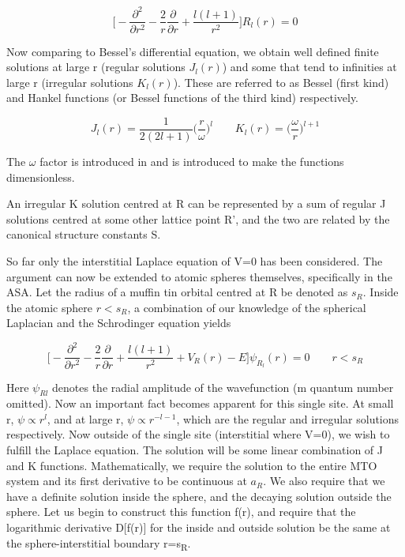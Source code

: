 \documentclass[12pt]{article}
\begin{document}
\begin{equation} \label{3.3} \tag{3.3}
\bigg[-\frac{\partial^2}{\partial r^2}-\frac{2}{r}\frac{\partial}{\partial r}+\frac{l(l+1)}{r^2} \bigg]R_l(r)=0
\end{equation}

Now comparing to Bessel's differential equation, we obtain well defined finite solutions at large r (regular solutions $J_l(r)$) and some that tend to infinities at large r (irregular solutions $K_l(r)$). These are referred to as Bessel (first kind) and Hankel functions (or Bessel functions of the third kind) respectively. 

\begin{equation} \label{3.4} \tag{3.4}
J_l(r)=\frac{1}{2(2l+1)}\bigg(\frac{r}{\omega}\bigg)^l \qquad K_l(r)=\bigg(\frac{\omega}{r}\bigg)^{l+1}
\end{equation}


The $\omega$ factor is introduced in \cite{andersen} and is introduced to make the functions dimensionless.

An irregular K solution centred at R can be represented by a sum of regular J solutions centred at some other lattice point R', and the two are related by the canonical structure constants S. %

So far only the interstitial Laplace equation of V=0 has been considered. The argument can now be extended to atomic spheres themselves, specifically in the ASA. Let the radius of a muffin tin orbital centred at R be denoted as $s_R$. Inside the atomic sphere $r<s_R$, a combination of our knowledge of the spherical Laplacian and the Schrodinger equation yields

\begin{equation} \label{3.5} \tag{3.5}
\bigg[-\frac{\partial^2}{\partial r^2}-\frac{2}{r}\frac{\partial}{\partial r}+\frac{l(l+1)}{r^2}+V_R(r)-E \bigg] \psi_R_l(r)=0 \qquad r<s_R
\end{equation}

Here $\psi_{Rl}$ denotes the radial amplitude of the wavefunction (m quantum number omitted). Now an important fact becomes apparent for this single site. At small r, $\psi \propto r^l$, and at large r, $\psi \propto r^{-l-1}$, which are the regular and irregular solutions respectively. Now outside of the single site (interstitial where V=0), we wish to fulfill the Laplace equation. The solution will be some linear combination of J and K functions. Mathematically, we require the solution to the entire MTO system and its first derivative to be continuous at $a_R$. We also require that we have a definite solution inside the sphere, and the decaying solution outside the sphere. Let us begin to construct this function f(r), and require that the logarithmic derivative D[f(r)] for the inside and outside solution be the same at the sphere-interstitial boundary r=s\textsubscript{R}. 
\end{document}
